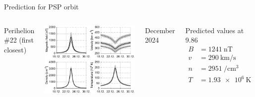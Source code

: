 \begin{frame}[plain,c]{Prediction for PSP orbit}{}
	\begin{columns}[c]
		
		\centering
		Perihelion \#22 (first closest)\\\ 
		
		\includegraphics[width=\textwidth]{../talk_figures/SPP_perihelia_prediction_nearest_f_defense.pdf}
		
		December 2024
		
		
		\begin{block}{\centering Predicted values at 9.86\,\Rs}
			\begin{align*}
				B &= \SI{1241}{\nano\tesla}\\
				v &= \SI{290}{\km\per\s}\\
				n &= \SI{2951}{\per\cm\cubed}\\
				T &= \SI{1.93e6}{\kelvin}
			\end{align*}
		\end{block}
		
	\end{columns}
\end{frame}
